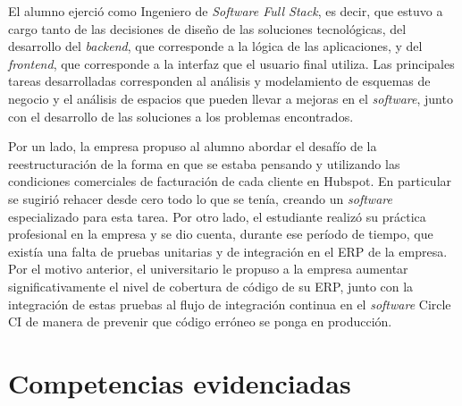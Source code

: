     El alumno ejerció como Ingeniero de \textit{Software Full Stack}, es decir, que estuvo a cargo tanto de las decisiones de diseño de las soluciones tecnológicas, del desarrollo del \textit{backend}, que corresponde a la lógica de las aplicaciones, y del \textit{frontend}, que corresponde a la interfaz que el usuario final utiliza. Las principales tareas desarrolladas corresponden al análisis y modelamiento de esquemas de negocio y el análisis de espacios que pueden llevar a mejoras en el \textit{software}, junto con el desarrollo de las soluciones a los problemas encontrados.
    
    Por un lado, la empresa propuso al alumno abordar el desafío de la reestructuración de la forma en que se estaba pensando y utilizando las condiciones comerciales de facturación de cada cliente en Hubspot. En particular se sugirió rehacer desde cero todo lo que se tenía, creando un \textit{software} especializado para esta tarea. Por otro lado, el estudiante realizó su práctica profesional en la empresa y se dio cuenta, durante ese período de tiempo, que existía una falta de pruebas unitarias y de integración en el ERP de la empresa. Por el motivo anterior, el universitario le propuso a la empresa aumentar significativamente el nivel de cobertura de código de su ERP, junto con la integración de estas pruebas al flujo de integración continua en el \textit{software} Circle CI de manera de prevenir que código erróneo se ponga en producción.



\section{Competencias evidenciadas}
    \label{competencias}


